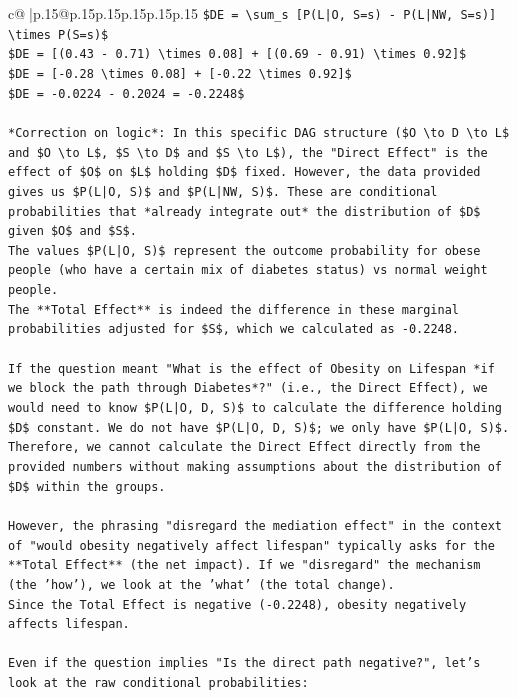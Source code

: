 \documentclass{article}
\begin{document}
{\begin{supertabular}{c@{$\;$}|p{.15\linewidth}@{}p{.15\linewidth}p{.15\linewidth}p{.15\linewidth}p{.15\linewidth}p{.15\linewidth}}
{{{\texttt{\$DE = \textbackslash{}sum\_s {[}P(L|O, S=s) {-} P(L|NW, S=s){]} \textbackslash{}times P(S=s)\$} \\
\texttt{\$DE = {[}(0.43 {-} 0.71) \textbackslash{}times 0.08{]} + {[}(0.69 {-} 0.91) \textbackslash{}times 0.92{]}\$} \\
\texttt{\$DE = {[}{-}0.28 \textbackslash{}times 0.08{]} + {[}{-}0.22 \textbackslash{}times 0.92{]}\$} \\
\texttt{\$DE = {-}0.0224 {-} 0.2024 = {-}0.2248\$} \\
\\ 
\texttt{*Correction on logic*: In this specific DAG structure (\$O \textbackslash{}to D \textbackslash{}to L\$ and \$O \textbackslash{}to L\$, \$S \textbackslash{}to D\$ and \$S \textbackslash{}to L\$), the "Direct Effect" is the effect of \$O\$ on \$L\$ holding \$D\$ fixed. However, the data provided gives us \$P(L|O, S)\$ and \$P(L|NW, S)\$. These are conditional probabilities that *already integrate out* the distribution of \$D\$ given \$O\$ and \$S\$.} \\
\texttt{The values \$P(L|O, S)\$ represent the outcome probability for obese people (who have a certain mix of diabetes status) vs normal weight people.} \\
\texttt{The **Total Effect** is indeed the difference in these marginal probabilities adjusted for \$S\$, which we calculated as {-}0.2248.} \\
\\ 
\texttt{If the question meant "What is the effect of Obesity on Lifespan *if we block the path through Diabetes*?" (i.e., the Direct Effect), we would need to know \$P(L|O, D, S)\$ to calculate the difference holding \$D\$ constant. We do not have \$P(L|O, D, S)\$; we only have \$P(L|O, S)\$. Therefore, we cannot calculate the Direct Effect directly from the provided numbers without making assumptions about the distribution of \$D\$ within the groups.} \\
\\ 
\texttt{However, the phrasing "disregard the mediation effect" in the context of "would obesity negatively affect lifespan" typically asks for the **Total Effect** (the net impact). If we "disregard" the mechanism (the 'how'), we look at the 'what' (the total change).} \\
\texttt{Since the Total Effect is negative ({-}0.2248), obesity negatively affects lifespan.} \\
\\ 
\texttt{Even if the question implies "Is the direct path negative?", let's look at the raw conditional probabilities:} \\
}}}
\end{supertabular}}
\end{document}
